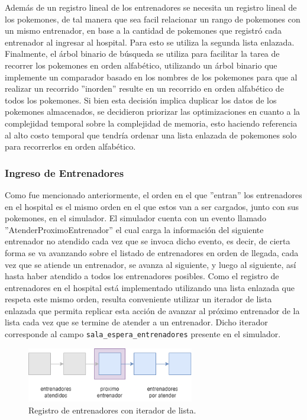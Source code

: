 \documentclass[titlepage,a4paper]{article}
\begin{document}
Además de un registro lineal de los entrenadores se necesita un registro lineal
de los pokemones, de tal manera que sea facil relacionar un rango de pokemones
con un mismo entrenador, en base a la cantidad de pokemones que registró cada
entrenador al ingresar al hospital. Para esto se utiliza la segunda lista
enlazada. Finalmente, el árbol binario de búsqueda se utiliza para facilitar
la tarea de recorrer los pokemones en orden alfabético, utilizando un árbol
binario que implemente un comparador basado en los nombres de los pokemones para
que al realizar un recorrido ''inorden'' resulte en un recorrido en orden
alfabético de todos los pokemones. Si bien esta decisión implica duplicar los
datos de los pokemones almacenados, se decidieron priorizar las optimizaciones
en cuanto a la complejidad temporal sobre la complejidad de memoria, esto
haciendo referencia al alto costo temporal que tendría ordenar una lista
enlazada de pokemones solo para recorrerlos en orden alfabético.

\subsubsection{Ingreso de Entrenadores}

Como fue mencionado anteriormente, el orden en el que ''entran'' los
entrenadores en el hospital es el mismo orden en el que estos van a ser
cargados, junto con sus pokemones, en el simulador. El simulador cuenta con un
evento llamado ''AtenderProximoEntrenador'' el cual carga la
información del siguiente entrenador no atendido cada vez que se invoca dicho
evento, es decir, de cierta forma se va avanzando sobre el listado de
entrenadores en orden de llegada, cada vez que se atiende un entrenador, se
avanza al siguiente, y luego al siguiente, así hasta haber atendido a todos los
entrenadores posibles. Como el registro de entrenadores en el hospital está
implementado utilizando una lista enlazada que respeta este mismo orden, resulta
conveniente utilizar un iterador de lista enlazada que permita replicar esta
acción de avanzar al próximo entrenador de la lista cada vez que se termine de
atender a un entrenador. Dicho iterador corresponde al campo
\lstinline{sala_espera_entrenadores} presente en el simulador.

\begin{figure}[H]
\centering
\includegraphics[width=0.65\textwidth]{img/2_iterador_entrenadores.png}
\caption{\label{fig:seq02}Registro de entrenadores con iterador de lista.}
\end{figure}
\end{document}
